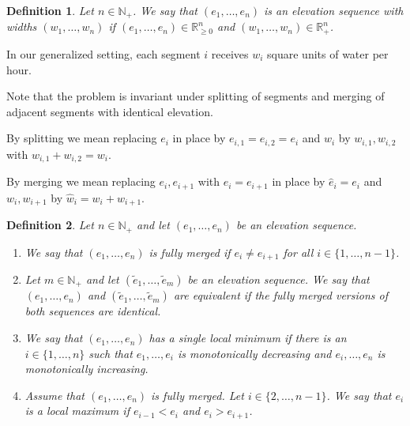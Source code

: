 \documentclass[11pt,a4paper]{article}
\newtheorem{defi}{Definition}
\newcommand{\Np}{\mathbb{N}_+}
\newcommand{\Rp}{\mathbb{R}_+}
\newcommand{\Rnn}{\mathbb{R}_{\ge0}}
\begin{document}
\begin{defi}
  Let $n\in\Np$.
  We say that $(e_1,\ldots,e_n)$ is an elevation sequence with widths $(w_1,\ldots,w_n)$ if
  $(e_1,\ldots,e_n) \in \Rnn^n$ and $(w_1,\ldots,w_n) \in \Rp^n$.
\end{defi}

In our generalized setting, each segment $i$ receives $w_i$ square units of water per hour.

Note that the problem is invariant under splitting of segments and merging of adjacent segments with identical elevation.

By splitting we mean replacing $e_i$ in place by $e_{i,1} = e_{i,2} = e_i$ and $w_i$ by $w_{i,1}, w_{i,2}$ with $w_{i,1} + w_{i,2} = w_i$.

By merging we mean replacing $e_i, e_{i+1}$ with $e_i = e_{i+1}$ in place by $\hat{e}_i = e_i$ and $w_i, w_{i+1}$ by $\hat{w}_i = w_i + w_{i+1}$.

\begin{defi}
    Let $n\in\Np$ and let $(e_1,\ldots,e_n)$ be an elevation sequence.
    \begin{enumerate}
    \item We say that $(e_1,\ldots,e_n)$ is fully merged if $e_i \ne e_{i+1}$ for all $i\in\{1,\ldots,n - 1\}$.
    \item Let $m\in\Np$ and let $(\tilde{e}_1,\ldots,\tilde{e}_m)$ be an elevation sequence.
        We say that $(e_1,\ldots,e_n)$ and $(\tilde{e}_1,\ldots,\tilde{e}_m)$ are equivalent if the fully merged versions of both sequences are identical.
    \item We say that $(e_1,\ldots,e_n)$ has a single local minimum if there is an
    $i\in\{1,\ldots,n\}$ such that $e_1,\ldots,e_i$ is monotonically decreasing and $e_i,\ldots,e_n$ is monotonically increasing.
    \item Assume that $(e_1,\ldots,e_n)$ is fully merged.
        Let $i\in\{2,\ldots,n-1\}$.
        We say that $e_i$ is a local maximum if $e_{i-1}<e_i$ and $e_i>e_{i+1}$.
    \end{enumerate}
\end{defi}
\end{document}
